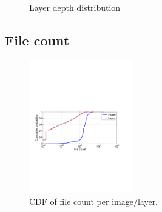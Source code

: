 \begin{figure}[!t]
	\centering
	\caption{Layer depth distribution}
	\label{fig:reference-cnt}
\end{figure}

\subsection{File count} 

\begin{figure}
	\centering
	\includegraphics[width=0.4\textwidth]{graphs/file-cnt-cdf.pdf}
	\caption{CDF of file count per image/layer.
	}
	\label{fig:reference-cnt}
\end{figure}

